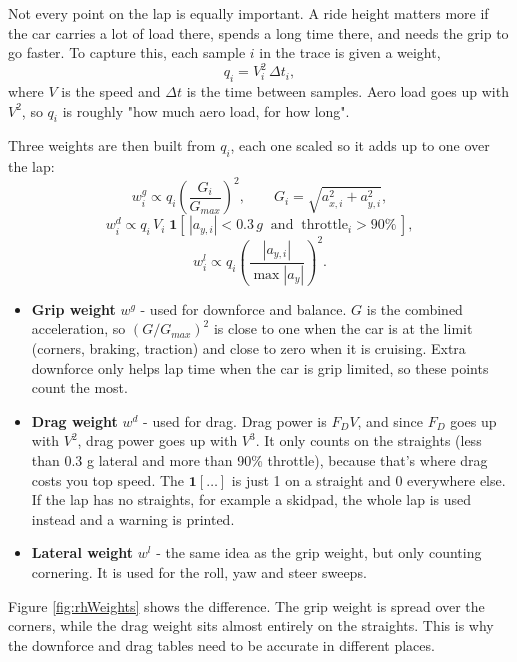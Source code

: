 Not every point on the lap is equally important. A ride height matters more if the car carries a lot of load there, spends a long time there, and needs the grip to go faster. To capture this, each sample $i$ in the trace is given a weight,
\begin{equation}
    q_i = V_i^2\,\Delta t_i,
\end{equation}
where $V$ is the speed and $\Delta t$ is the time between samples. Aero load goes up with $V^2$, so $q_i$ is roughly "how much aero load, for how long".

Three weights are then built from $q_i$, each one scaled so it adds up to one over the lap:
\begin{equation}
    w^{g}_i \propto q_i\left(\frac{G_i}{G_{max}}\right)^2, \qquad G_i = \sqrt{a_{x,i}^2 + a_{y,i}^2},
\end{equation}
\begin{equation}
    w^{d}_i \propto q_i\,V_i\;\mathbf{1}\!\left[\,|a_{y,i}| < 0.3\,g \;\;\mathrm{and}\;\; \mathrm{throttle}_i > 90\%\,\right],
\end{equation}
\begin{equation}
    w^{l}_i \propto q_i\left(\frac{|a_{y,i}|}{\max|a_y|}\right)^2 .
\end{equation}
\begin{itemize}
    \item \textbf{Grip weight} $w^g$ - used for downforce and balance. $G$ is the combined acceleration, so $(G/G_{max})^2$ is close to one when the car is at the limit (corners, braking, traction) and close to zero when it is cruising. Extra downforce only helps lap time when the car is grip limited, so these points count the most.

    \item \textbf{Drag weight} $w^d$ - used for drag. Drag power is $F_D V$, and since $F_D$ goes up with $V^2$, drag power goes up with $V^3$. It only counts on the straights (less than 0.3 g lateral and more than 90\% throttle), because that's where drag costs you top speed. The $\mathbf{1}[\dots]$ is just 1 on a straight and 0 everywhere else. If the lap has no straights, for example a skidpad, the whole lap is used instead and a warning is printed.

    \item \textbf{Lateral weight} $w^l$ - the same idea as the grip weight, but only counting cornering. It is used for the roll, yaw and steer sweeps.
\end{itemize}
Figure \ref{fig:rhWeights} shows the difference. The grip weight is spread over the corners, while the drag weight sits almost entirely on the straights. This is why the downforce and drag tables need to be accurate in different places.

